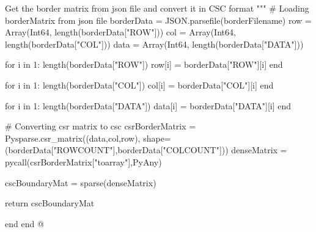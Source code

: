 \documentclass[11pt,oneside]{article}	%
\begin{document}
{  Get the border matrix from json file and convert it in
  CSC format
  """
  # Loading borderMatrix from json file
  borderData = JSON.parsefile(borderFilename)
  row = Array(Int64, length(borderData["ROW"]))
  col = Array(Int64, length(borderData["COL"]))
  data = Array(Int64, length(borderData["DATA"]))

  for i in 1: length(borderData["ROW"])
    row[i] = borderData["ROW"][i]
  end

  for i in 1: length(borderData["COL"])
    col[i] = borderData["COL"][i]
  end

  for i in 1: length(borderData["DATA"])
    data[i] = borderData["DATA"][i]
  end

  # Converting csr matrix to csc
  csrBorderMatrix = Pysparse.csr_matrix((data,col,row), shape=(borderData["ROWCOUNT"],borderData["COLCOUNT"]))
  denseMatrix = pycall(csrBorderMatrix["toarray"],PyAny)

  cscBoundaryMat = sparse(denseMatrix)

  return cscBoundaryMat

end
end
@}
\end{document}
